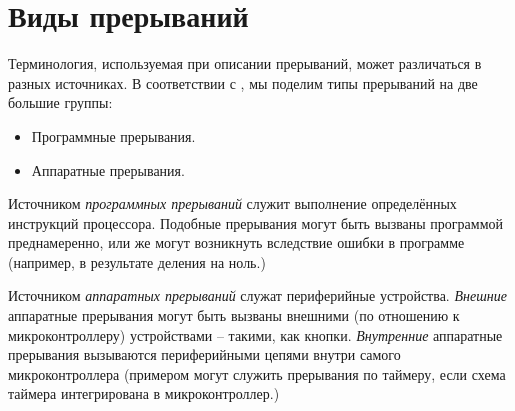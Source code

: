 \documentclass[../sparc.tex]{subfiles}
\begin{document}
\section{Виды прерываний}


Терминология, используемая при описании прерываний, может различаться в разных
источниках.  В соответствии с \cite{toshiba:interrupts}, мы поделим типы
прерываний на две большие группы:
\begin{itemize}
\item Программные прерывания.
\item Аппаратные прерывания.
\end{itemize}

Источником \emph{программных прерываний} служит выполнение определённых
инструкций процессора.  Подобные прерывания могут быть вызваны программой
преднамеренно, или же могут возникнуть вследствие ошибки в программе (например,
в результате деления на ноль.)

Источником \emph{аппаратных прерываний} служат периферийные устройства.
\emph{Внешние} аппаратные прерывания могут быть вызваны внешними (по отношению к
микроконтроллеру) устройствами -- такими, как кнопки.  \emph{Внутренние}
аппаратные прерывания вызываются периферийными цепями внутри самого
микроконтроллера (примером могут служить прерывания по таймеру, если схема
таймера интегрирована в микроконтроллер.)
\end{document}
